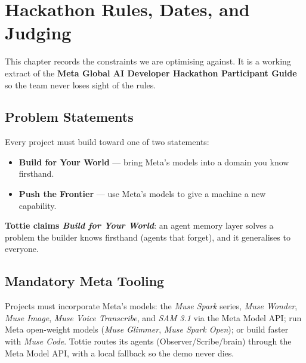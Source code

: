 \chapter{Hackathon Rules, Dates, and Judging}

This chapter records the constraints we are optimising against. It is a working extract of the
\textbf{Meta Global AI Developer Hackathon Participant Guide} so the team never loses sight of the
rules.

\section{Problem Statements}
Every project must build toward one of two statements:
\begin{itemize}
  \item \textbf{Build for Your World} --- bring Meta's models into a domain you know firsthand.
  \item \textbf{Push the Frontier} --- use Meta's models to give a machine a new capability.
\end{itemize}
\textbf{Tottie claims \emph{Build for Your World}}: an agent memory layer solves a problem the
builder knows firsthand (agents that forget), and it generalises to everyone.

\section{Mandatory Meta Tooling}
Projects must incorporate Meta's models: the \emph{Muse Spark} series, \emph{Muse Wonder},
\emph{Muse Image}, \emph{Muse Voice Transcribe}, and \emph{SAM 3.1} via the Meta Model API; run
Meta open-weight models (\emph{Muse Glimmer}, \emph{Muse Spark Open}); or build faster with
\emph{Muse Code}. Tottie routes its agents (Observer/Scribe/brain) through the Meta Model API, with
a local fallback so the demo never dies.

